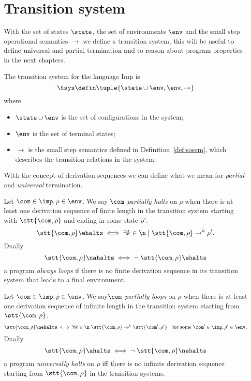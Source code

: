 \section{Transition system}

With the set of states \(\state\), the set of environments \(\env\)
and the small step operational semantics \(\to\) we define a
transition system, this will be useful to define universal and partial
termination and to reason about program properties in the next
chapters.

\begin{definition} The transition system for the
  language Imp is
  \[\tsys \defin \tuple{\state \cup \env, \env, \to}\] where
  \begin{itemize}
  \item \(\state \cup \env\) is the set of configurations in the system;
  \item \(\env\) is the set of terminal states;
  \item \(\to\) is the small step semantics defined in
    Definition~\ref{def:sosem}, which describes the transition
    relations in the system.
  \end{itemize}
\end{definition}
\noindent
With the concept of derivation sequences we can define what we mean for
\emph{partial} and \emph{universal} termination.
\begin{definition}
  Let \(\com \in \imp, \rho \in \env\). We say \(\com\)
  \emph{partially halts} on \(\rho\) when there is at least one
  derivation sequence of finite length in the transition system
  starting with \(\stt{\com,\rho}\) and ending in some state
  \(\rho'\):
  \[ \stt{\com, \rho} \ehalts \iff \exists k \in \n \mid \stt{\com,
      \rho} \to^k \rho'.\] Dually
  \[ \stt{\com, \rho} \nahalts \iff \neg \; \stt{\com, \rho}
    \ehalts \] a program \emph{always loops} if there is no finite
  derivation sequence in its transition system that leads to a final
  environment.
\end{definition}
\begin{definition}
  Let \(\com \in \imp, \rho \in \env\). We say\(\com\) \emph{partially
    loops} on \(\rho\) when there is at least one derivation sequence
  of infinite length in the transition system starting from
  \(\stt{\com, \rho}\):
  \[ \stt{\com, \rho} \nehalts \iff \forall k \in \n \; \stt{\com,
      \rho} \to^k \stt{\com', \rho'} \quad \text{for some }
    \com'\in\imp, \rho'\in\env.\] Dually
  \begin{equation*}
    \stt{\com, \rho} \ahalts \iff \neg \; \stt{\com, \rho}
    \nehalts
  \end{equation*}
  a program \emph{universally halts} on \(\rho\) iff there is no
  infinite derivation sequence starting from \(\stt{\com, \rho}\) in
  the transition systems.
\end{definition}

